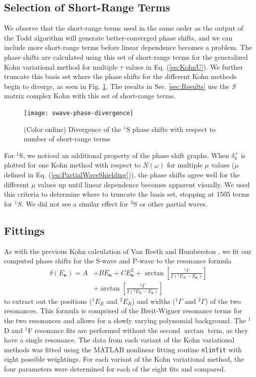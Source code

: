 \documentclass[reprint,showpacs,preprintnumbers,amsmath,amssymb,pra,aps]{revtex4-1}
\begin{document}
\subsection{Selection of Short-Range Terms}
\label{sec:Truncation}
We observe that the short-range terms used in the same order as the output of the Todd algorithm will generate better-converged phase shifts, and we can include more short-range terms before linear dependence becomes a problem. The phase shifts are calculated using this set of short-range terms for the generalized Kohn variational method for multiple $\tau$ values in Eq. (\ref{eq:KohnU}). We further truncate this basis set where the phase shifts for the different Kohn methods begin to diverge, as seen in Fig. \ref{fig:swave-phase-divergence}. The results in Sec. \ref{sec:Results} use the \emph{S} matrix complex Kohn with this set of short-range terms.

\begin{figure}[H]
	\centering
	\texttt{[image: swave-phase-divergence]}
	\caption{(Color online) Divergence of the $^1$S phase shifts with respect to number of short-range terms}
	\label{fig:swave-phase-divergence}
\end{figure}

For $^1$S, we noticed an additional property of the phase shift graphs. When $\delta_0^+$ is plotted for one Kohn method with respect to $N(\omega)$ for multiple $\mu$ values ($\mu$ defined in Eq. (\ref{eq:PartialWaveShielding})), the phase shifts agree well for the different $\mu$ values up until linear dependence becomes apparent visually. We used this criteria to determine where to truncate the basis set, stopping at 1505 terms for $^1S$. We did not see a similar effect for $^3$S or other partial waves.

\subsection{Fittings}
As with the previous Kohn calculation of Van Reeth and Humberston \cite{VanReeth2004}, we fit our computed phase shifts for the S-wave and P-wave to the resonance formula
\begin{align}
\label{eq:ResonanceFit}
\delta(E_{\bm \kappa}) = A &+ B E_{\bm \kappa} + C E_{\bm \kappa}^2 + \arctan \left[ \frac{^1\Gamma}{2(^1E_R - E_{\bm \kappa})} \right]  \nonumber \\
& + \arctan \left[ \frac{^2\Gamma}{2(^2E_R - E_{\bm \kappa})} \right]
\end{align}
to extract out the positions ($^1E_R$ and $^2E_R$) and widths
($^1\Gamma$ and $^2\Gamma$) of the two resonances. 
This formula is comprised of the Breit-Wigner resonance
terms \cite{Bransden2003} for the two resonances and allows for a slowly varying polynomial
background. The $^1$D and $^1$F resonance fits are performed without the second $\arctan$ term, as they have a single resonance. 
The data from each variant of the Kohn variational methods was fitted using the MATLAB \cite{MATLAB} nonlinear fitting routine \texttt{nlinfit} with eight possible weightings.
For each variant of the Kohn variational method, the four parameters were determined for each of the eight fits and compared.
\end{document}
